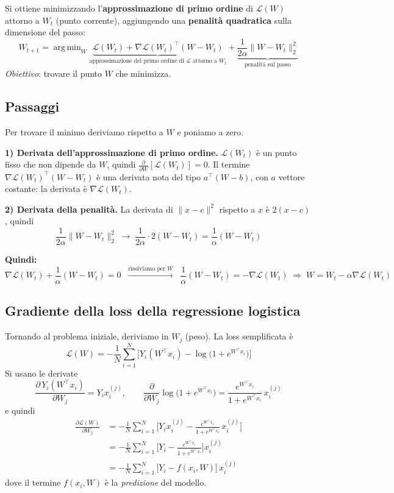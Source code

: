 \documentclass[11pt,a4paper]{article}
\DeclareMathOperator*{\argmin}{arg\,min}
\begin{document}
Si ottiene minimizzando l'\textbf{approssimazione di primo ordine} di $\mathcal{L}(W)$ attorno a $W_t$ (punto corrente), aggiungendo una \textbf{penalità quadratica} sulla dimensione del passo:
\[
W_{t+1} = \argmin_W \underbrace{\mathcal{L}(W_t) + \nabla\mathcal{L}(W_t)^\top (W-W_t)}_{\text{approssimazione del primo ordine di } \mathcal{L} \text{ attorno a } W_t} + \underbrace{\frac{1}{2\alpha}\|W-W_t\|_2^2}_{\text{penalità sul passo}}
\]
\emph{Obiettivo}: trovare il punto $W$ che minimizza.

\subsection{Passaggi}
Per trovare il minimo deriviamo rispetto a $W$ e poniamo a zero.

\textbf{1) Derivata dell'approssimazione di primo ordine.}
$\mathcal{L}(W_t)$ è un punto fisso che non dipende da $W$, quindi $\frac{\partial}{\partial W}[\mathcal{L}(W_t)] = 0$. Il termine $\nabla\mathcal{L}(W_t)^\top(W-W_t)$ è una derivata nota del tipo $a^\top(W-b)$, con $a$ vettore costante: la derivata è $\nabla\mathcal{L}(W_t)$.

\textbf{2) Derivata della penalità.}
La derivata di $\|x-c\|^2$ rispetto a $x$ è $2(x-c)$, quindi
\[
\frac{1}{2\alpha}\|W-W_t\|_2^2 \;\longrightarrow\; \frac{1}{2\alpha}\cdot 2(W-W_t) = \frac{1}{\alpha}(W-W_t)
\]

\textbf{Quindi:}
\[
\nabla\mathcal{L}(W_t) + \frac{1}{\alpha}(W-W_t) = 0
\;\;\xrightarrow{\text{risolviamo per } W}\;\;
\frac{1}{\alpha}(W-W_t) = -\nabla\mathcal{L}(W_t)
\;\Rightarrow\;
\boxed{W = W_t - \alpha\nabla\mathcal{L}(W_t)}
\]

\subsection{Gradiente della loss della regressione logistica}
Tornando al problema iniziale, deriviamo in $W_j$ (peso). La loss semplificata è
\[
\mathcal{L}(W) = -\frac{1}{N}\sum_{i=1}^{N}\Big[Y_i (W^\top x_i) - \log\big(1+e^{W^\top x_i}\big)\Big]
\]
Si usano le derivate
\[
\frac{\partial\, Y_i(W^\top x_i)}{\partial W_j} = Y_i x_i^{(j)}, \qquad
\frac{\partial}{\partial W_j}\log\big(1+e^{W^\top x_i}\big) = \frac{e^{W^\top x_i}}{1+e^{W^\top x_i}}\, x_i^{(j)}
\]
e quindi
\begin{align*}
\frac{\partial\mathcal{L}(W)}{\partial W_j}
&= -\frac{1}{N}\sum_{i=1}^{N}\Big[Y_i x_i^{(j)} - \frac{e^{W^\top x_i}}{1+e^{W^\top x_i}}\, x_i^{(j)}\Big]\\
&= -\frac{1}{N}\sum_{i=1}^{N}\Big[Y_i - \frac{e^{W^\top x_i}}{1+e^{W^\top x_i}}\Big] x_i^{(j)}\\
&= -\frac{1}{N}\sum_{i=1}^{N}\big[Y_i - f(x_i,W)\big]\, x_i^{(j)}
\end{align*}
dove il termine $f(x_i,W)$ è la \emph{predizione} del modello.
\end{document}
